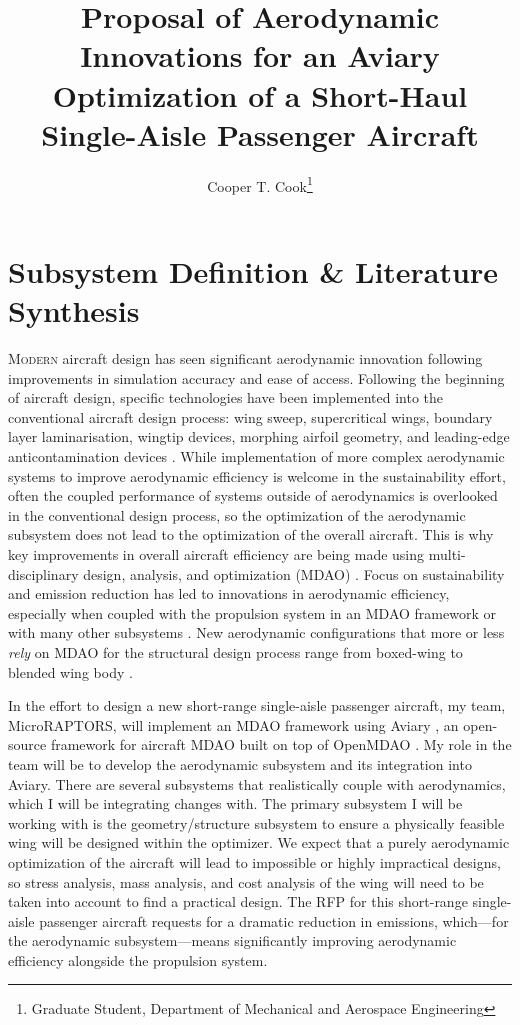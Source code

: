 \documentclass[conf]{new-aiaa}
\title{Proposal of Aerodynamic Innovations for an Aviary Optimization of a Short-Haul Single-Aisle Passenger Aircraft}
\author{Cooper T. Cook\footnote{Graduate Student, Department of Mechanical and Aerospace Engineering}}
\affil{University of California, Davis, California 95616}
\begin{document}
\maketitle

\section{Subsystem Definition \& Literature Synthesis}
\lettrine{M}{odern} aircraft design has seen significant aerodynamic innovation following improvements in simulation accuracy and ease of access. Following the beginning of aircraft design, specific technologies have been implemented into the conventional aircraft design process: wing sweep, supercritical wings, boundary layer laminarisation, wingtip devices, morphing airfoil geometry, and leading-edge anticontamination devices \cite{coelho_barbosa_aircraft_2023}. While implementation of more complex aerodynamic systems to improve aerodynamic efficiency is welcome in the sustainability effort, often the coupled performance of systems outside of aerodynamics is overlooked in the conventional design process, so the optimization of the aerodynamic subsystem does not lead to the optimization of the overall aircraft. This is why key improvements in overall aircraft efficiency are being made using multi-disciplinary design, analysis, and optimization (MDAO) \cite{leng_multidisciplinary_2025}. Focus on sustainability and emission reduction has led to innovations in aerodynamic efficiency, especially when coupled with the propulsion system in an MDAO framework \cite{bravo-mosquera_design_2022} or with many other subsystems \cite{press_of_acta_aero_et_astro_sinica_integrated_2026}. New aerodynamic configurations that more or less \emph{rely} on MDAO for the structural design process range from boxed-wing \cite{jemitola_analysis_2023} to blended wing body \cite{handa_recent_2022}.

In the effort to design a new short-range single-aisle passenger aircraft, my team, MicroRAPTORS, will implement an MDAO framework using Aviary \cite{gratz_aviary_2024}, an open-source framework for aircraft MDAO built on top of OpenMDAO \cite{gray_openmdao_2019}. My role in the team will be to develop the aerodynamic subsystem and its integration into Aviary. There are several subsystems that realistically couple with aerodynamics, which I will be integrating changes with. The primary subsystem I will be working with is the geometry/structure subsystem to ensure a physically feasible wing will be designed within the optimizer. We expect that a purely aerodynamic optimization of the aircraft will lead to impossible or highly impractical designs, so stress analysis, mass analysis, and cost analysis of the wing will need to be taken into account to find a practical design. The RFP for this short-range single-aisle passenger aircraft requests for a dramatic reduction in emissions, which---for the aerodynamic subsystem---means significantly improving aerodynamic efficiency alongside the propulsion system.
\end{document}
